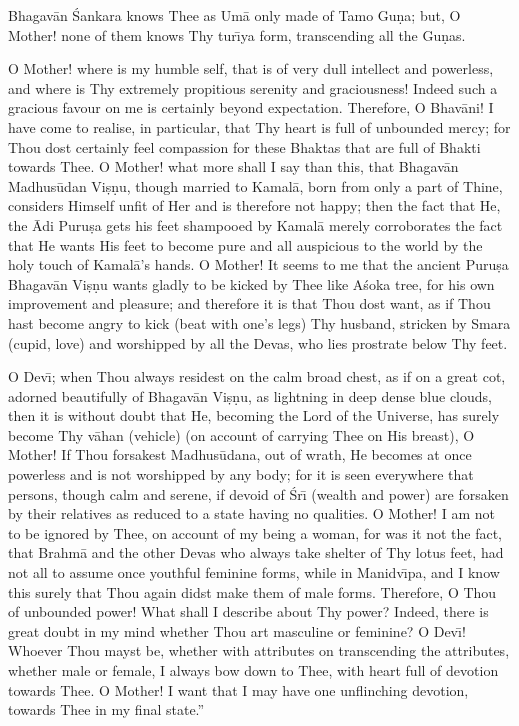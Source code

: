 Bhagav\=an \'Sankara knows Thee as Um\=a only made of Tamo Gu\d{n}a; but, O Mother! none of them knows Thy tur\={\i}ya form, transcending all the Gu\d{n}as.

O Mother! where is my humble self, that is of very dull intellect and powerless, and where is Thy extremely propitious serenity and graciousness! Indeed such a gracious favour on me is certainly beyond expectation. Therefore, O Bhav\=ani! I have come to realise, in particular, that Thy heart is full of unbounded mercy; for Thou dost certainly feel compassion for these Bhaktas that are full of Bhakti towards Thee. O Mother! what more shall I say than this, that Bhagav\=an Madhus\=udan Vi\d{s}\d{n}u, though married to Kamal\=a, born from only a part of Thine, considers Himself unfit of Her and is therefore not happy; then the fact that He, the \=Adi Puru\d{s}a gets his feet shampooed by Kamal\=a merely corroborates the fact that He wants His feet to become pure and all auspicious to the world by the holy touch of Kamal\=a's hands. O Mother! It seems to me that the ancient Puru\d{s}a Bhagav\=an Vi\d{s}\d{n}u wants gladly to be kicked by Thee like A\'soka tree, for his own improvement and pleasure; and therefore it is that Thou dost want, as if Thou hast become angry to kick (beat with one's legs) Thy husband, stricken by Smara (cupid, love) and worshipped by all the Devas, who lies prostrate below Thy feet.

O Dev\={\i}; when Thou always residest on the calm broad chest, as if on a great cot, adorned beautifully of Bhagav\=an Vi\d{s}\d{n}u, as lightning in deep dense blue clouds, then it is without doubt that He, becoming the Lord of the Universe, has surely become Thy v\=ahan (vehicle) (on account of carrying Thee on His breast), O Mother! If Thou forsakest Madhus\=udana, out of wrath, He becomes at once powerless and is not worshipped by any body; for it is seen everywhere that persons, though calm and serene, if devoid of \'Sr\={\i} (wealth and power) are forsaken by their relatives as reduced to a state having no qualities. O Mother! I am not to be ignored by Thee, on account of my being a woman, for was it not the fact, that Brahm\=a and the other Devas who always take shelter of Thy lotus feet, had not all to assume once youthful feminine forms, while in Manidv\={\i}pa, and I know this surely that Thou again didst make them of male forms. Therefore, O Thou of unbounded power! What shall I describe about Thy power? Indeed, there is great doubt in my mind whether Thou art masculine or feminine? O Dev\={\i}! Whoever Thou mayst be, whether with attributes on transcending the attributes, whether male or female, I always bow down to Thee, with heart full of devotion towards Thee. O Mother! I want that I may have one unflinching devotion, towards Thee in my final state.''

